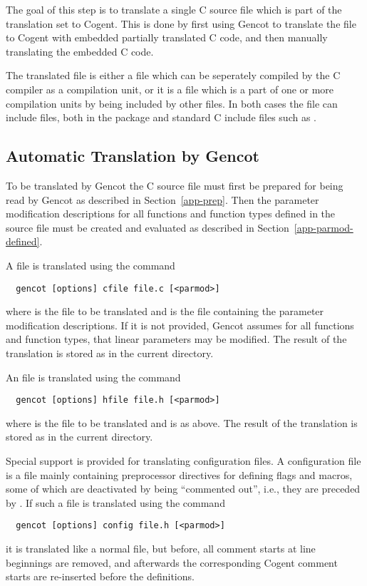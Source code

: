The goal of this step is to translate a single C source file which is part of the translation set to Cogent.
This is done by first using Gencot to translate the file to Cogent with embedded partially translated C code,
and then manually translating the embedded C code.

The translated file is either a  file which can be seperately compiled by the C compiler as a compilation unit,
or it is a  file which is a part of one or more compilation units by being included by other files. In both cases
the file can include  files, both in the package and standard C include files such as .

\subsection{Automatic Translation by Gencot}
\label{app-trans-auto}

To be translated by Gencot the C source file must first be prepared for being read by Gencot as described in
Section~\ref{app-prep}. Then the parameter modification descriptions for all functions and function types defined 
in the source file must be created and evaluated as described in Section~\ref{app-parmod-defined}. 

A  file is translated using the command
\begin{verbatim}
  gencot [options] cfile file.c [<parmod>]
\end{verbatim}
where  is the file to be translated and  is the file containing the parameter modification 
descriptions. If it is not provided, Gencot assumes for all functions and function types, that linear parameters 
may be modified. The result of the translation is stored as  in the current directory.

An  file is translated using the command
\begin{verbatim}
  gencot [options] hfile file.h [<parmod>]
\end{verbatim}
where  is the file to be translated and  is as above. The result of the translation is 
stored as  in the current directory.

Special support is provided for translating configuration files. A configuration file is a  file mainly
containing preprocessor directives for defining flags and macros, some of which are deactivated by being ``commented
out'', i.e., they are preceded by \code{//}. If such a file is translated using the command
\begin{verbatim}
  gencot [options] config file.h [<parmod>]
\end{verbatim}
it is translated like a normal  file, but before, all \code{//} comment starts at line beginnings are 
removed, and afterwards the corresponding Cogent comment starts \code{--} are re-inserted before the definitions.

